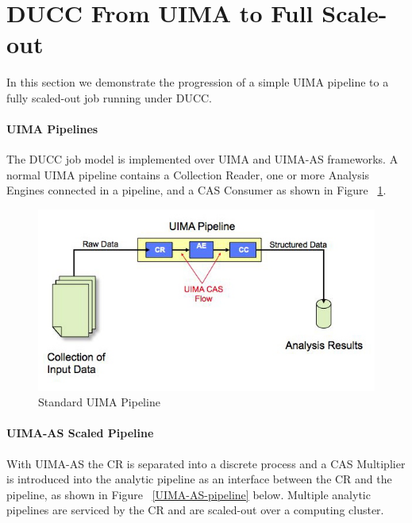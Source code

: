     \section{DUCC From UIMA to Full Scale-out}

    In this section we demonstrate the progression of a simple UIMA pipeline to a fully
    scaled-out job running under DUCC.

    \paragraph{UIMA Pipelines}
    The DUCC job model is implemented over UIMA and UIMA-AS frameworks. A normal UIMA pipeline
    contains a Collection Reader, one or more Analysis Engines connected in a pipeline, and a CAS
    Consumer as shown in Figure ~\ref{UIMA-pipeline}.

    \begin{figure}[H]
      \centering
      \includegraphics[bb=0 0 575 310, width=5.5in]{images/uima-pipeline.jpg}
      \caption{Standard UIMA Pipeline}
      \label{UIMA-pipeline}
    \end{figure}

    \paragraph{UIMA-AS  Scaled Pipeline}
    With UIMA-AS the CR is separated into a discrete process and a CAS Multiplier is introduced 
    into the analytic pipeline as an interface between the CR and the pipeline, as shown in Figure
    ~\ref{UIMA-AS-pipeline} below.
    Multiple analytic pipelines are serviced by the 
    CR and are scaled-out over a computing cluster. 

